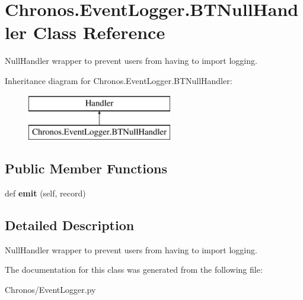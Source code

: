 \hypertarget{classChronos_1_1EventLogger_1_1BTNullHandler}{}\section{Chronos.\+Event\+Logger.\+B\+T\+Null\+Handler Class Reference}
\label{classChronos_1_1EventLogger_1_1BTNullHandler}


Null\+Handler wrapper to prevent users from having to import logging.  


Inheritance diagram for Chronos.\+Event\+Logger.\+B\+T\+Null\+Handler\+:\begin{figure}[H]
\begin{center}
\leavevmode
\includegraphics[height=2.000000cm]{classChronos_1_1EventLogger_1_1BTNullHandler}
\end{center}
\end{figure}
\subsection*{Public Member Functions}
\begin{DoxyCompactItemize}
\item 
def {\bfseries emit} (self, record)
\end{DoxyCompactItemize}


\subsection{Detailed Description}
Null\+Handler wrapper to prevent users from having to import logging. 

The documentation for this class was generated from the following file\+:\begin{DoxyCompactItemize}
\item 
Chronos/Event\+Logger.\+py\end{DoxyCompactItemize}
